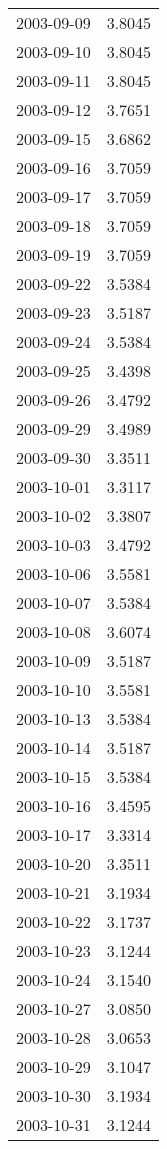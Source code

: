 \begin{tabular}{lr}
2003-09-09 &      3.8045 \\
2003-09-10 &      3.8045 \\
2003-09-11 &      3.8045 \\
2003-09-12 &      3.7651 \\
2003-09-15 &      3.6862 \\
2003-09-16 &      3.7059 \\
2003-09-17 &      3.7059 \\
2003-09-18 &      3.7059 \\
2003-09-19 &      3.7059 \\
2003-09-22 &      3.5384 \\
2003-09-23 &      3.5187 \\
2003-09-24 &      3.5384 \\
2003-09-25 &      3.4398 \\
2003-09-26 &      3.4792 \\
2003-09-29 &      3.4989 \\
2003-09-30 &      3.3511 \\
2003-10-01 &      3.3117 \\
2003-10-02 &      3.3807 \\
2003-10-03 &      3.4792 \\
2003-10-06 &      3.5581 \\
2003-10-07 &      3.5384 \\
2003-10-08 &      3.6074 \\
2003-10-09 &      3.5187 \\
2003-10-10 &      3.5581 \\
2003-10-13 &      3.5384 \\
2003-10-14 &      3.5187 \\
2003-10-15 &      3.5384 \\
2003-10-16 &      3.4595 \\
2003-10-17 &      3.3314 \\
2003-10-20 &      3.3511 \\
2003-10-21 &      3.1934 \\
2003-10-22 &      3.1737 \\
2003-10-23 &      3.1244 \\
2003-10-24 &      3.1540 \\
2003-10-27 &      3.0850 \\
2003-10-28 &      3.0653 \\
2003-10-29 &      3.1047 \\
2003-10-30 &      3.1934 \\
2003-10-31 &      3.1244 \\

\end{tabular}
